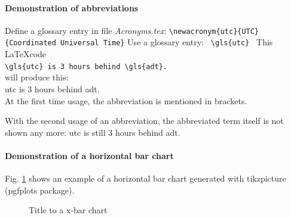 \paragraph{Demonstration of abbreviations}
Define a glossary entry in file \textit{Acronyms.tex}:
\newline
\verb!\newacronym{utc}{UTC}{Coordinated Universal Time}!
\newline
Use a glossary entry: \verb! \gls{utc} !
\newline
This \LaTeX code \\

\verb*|\gls{utc} is 3 hours behind \gls{adt}.| \\

will produce this: \\

\gls{utc} is 3 hours behind \gls{adt}.\\

At the first time usage, the abbreviation is mentioned in brackets.

With the second usage of an abbreviation, the abbreviated term itself is not shown any more:
\gls{utc} is still 3 hours behind \gls{adt}.\\

\paragraph{Demonstration of a horizontal bar chart}
Fig. \ref{fig:XBarChart} shows an example of a horizontal bar chart generated with tikzpicture (pgfplots package).

\begin{figure}[!h]
	\centering
	\caption{\label{fig:XBarChart}Title to a x-bar chart}
\end{figure}

